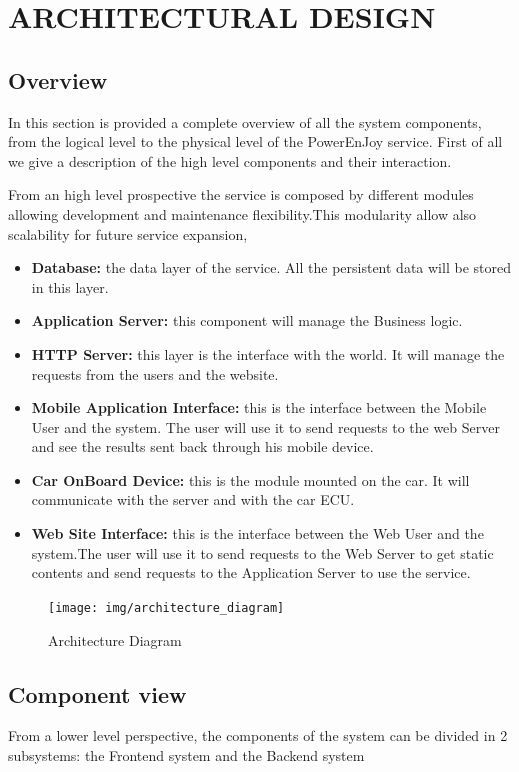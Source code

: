 \section{ARCHITECTURAL DESIGN}
\subsection{Overview} 
In this section is provided a complete overview of all the system components, from the logical level to the physical level of the PowerEnJoy service. First of all we give a description of the high level components and their interaction.\newline

\noindent From an high level prospective the service is composed by different modules allowing development and maintenance flexibility.This modularity allow also scalability for future service expansion,  \newline


\begin{itemize}
\item{\textbf{Database:}} the data layer of the service. All the persistent data will be stored in this layer.
\item{\textbf{Application Server:}} this component will manage the Business logic.
\item{\textbf{HTTP Server:}} this layer is the interface with the world. It will manage the requests from the users and the website.
\item{\textbf{Mobile Application Interface:}} this is the interface between the Mobile User and the system. The user will use it to send requests to the web Server and see the results sent back through his mobile device. 
\item{\textbf{Car OnBoard Device:}} this is the module mounted on the car. It will communicate with the server and with the car ECU.
\item{\textbf{Web Site Interface:}} this is the interface between the Web User and the system.The user will use it to send requests to the Web Server to get static contents and send requests to the Application Server to use the service.
\end{itemize}

	\begin{figure}[H]	
	\centering
	\texttt{[image: img/architecture\_diagram]}
	\caption{Architecture Diagram}
\end{figure}


\newpage
\subsection{Component view} 
From a lower level perspective, the components of the system can be divided in 2 subsystems: the Frontend system and the Backend system



